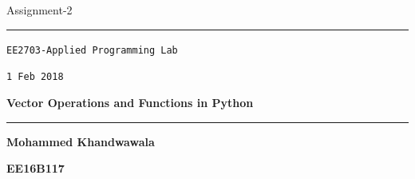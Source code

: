 \documentclass[letterpaper, 12pt]{article}
\begin{document}
\begin{center}
\Huge Assignment-2 
\vspace{3mm}
\rule[0mm]{20mm}{0.2mm}
\vspace{-8mm}
\begin{multicols}{2}
\begin{flushleft}
\begin{large}
\texttt{EE2703-Applied Programming Lab}\\
\end{large}
\end{flushleft}
\begin{flushright}
\begin{small}
\texttt{1 Feb 2018}
\end{small}
\end{flushright}
\end{multicols}
\vspace{5mm}
\end{center}
\vspace{-14mm}
\begin{center}
\begin{huge}
\textbf{Vector Operations and Functions in Python}
\end{huge}
\end{center}
\vspace{2mm}
\rule[10mm]{20mm}{0.5mm}
\begin{multicols}{2}
\begin{flushleft}
\begin{Large}
\textbf{Mohammed Khandwawala}
\end{Large}
\end{flushleft}
\begin{flushright}
\textbf{EE16B117}
\end{flushright}
\end{multicols}
\tableofcontents
\clearpage
\end{document}
